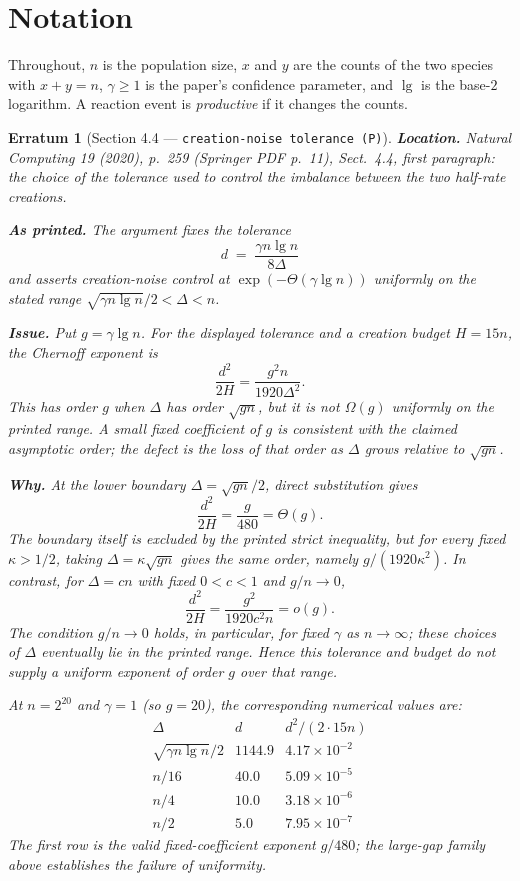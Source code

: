 \documentclass[11pt]{article}
\theoremstyle{erratumstyle}
\newtheorem{erratum}{Erratum}
\newcommand{\lgn}{\lg n}
\begin{document}
\section*{Notation}

Throughout, $n$ is the population size, $x$ and $y$ are the counts of the two
species with $x+y=n$, $\gamma \ge 1$ is the paper's confidence parameter, and
$\lg$ is the base-$2$ logarithm. A reaction event is \emph{productive} if it
changes the counts.

\begin{erratum}[Section 4.4 --- \texttt{creation-noise tolerance (P)}]
\textbf{Location.} \emph{Natural Computing} 19 (2020), p.~259
(Springer PDF p.~11), Sect.~4.4, first paragraph: the choice of the tolerance
used to control the imbalance between the two half-rate creations.

\medskip
\textbf{As printed.} The argument fixes the tolerance
\[
  d \;=\; \frac{\gamma n\lgn}{8\Delta}
\]
and asserts creation-noise control at $\exp(-\Theta(\gamma\lgn))$ uniformly on
the stated range $\sqrt{\gamma n\lgn}/2 < \Delta < n$.

\medskip
\textbf{Issue.} Put $g=\gamma\lgn$. For the displayed tolerance and a
creation budget $H=15n$, the Chernoff exponent is
\[
  \frac{d^2}{2H}=\frac{g^2n}{1920\Delta^2}.
\]
This has order $g$ when $\Delta$ has order $\sqrt{gn}$, but it is not
$\Omega(g)$ uniformly on the printed range. A small fixed coefficient of
$g$ is consistent with the claimed asymptotic order; the defect is the loss
of that order as $\Delta$ grows relative to $\sqrt{gn}$.

\medskip
\textbf{Why.} At the lower boundary $\Delta=\sqrt{gn}/2$, direct substitution
gives
\[
  \frac{d^2}{2H}=\frac{g}{480}=\Theta(g).
\]
The boundary itself is excluded by the printed strict inequality, but for
every fixed $\kappa>1/2$, taking $\Delta=\kappa\sqrt{gn}$ gives the same
order, namely $g/(1920\kappa^2)$. In contrast, for $\Delta=cn$ with fixed
$0<c<1$ and $g/n\to0$,
\[
  \frac{d^2}{2H}=\frac{g^2}{1920c^2n}=o(g).
\]
The condition $g/n\to0$ holds, in particular, for fixed $\gamma$ as
$n\to\infty$; these choices of $\Delta$ eventually lie in the printed
range. Hence this tolerance and budget do not supply a uniform exponent
of order $g$ over that range.

At $n=2^{20}$ and $\gamma=1$ (so $g=20$), the corresponding numerical
values are:
\[
  \begin{array}{c|c|c}
    \Delta & d & d^2/(2\cdot 15 n)\\\hline
    \sqrt{\gamma n\lgn}/2 & 1144.9 & 4.17\times10^{-2}\\
    n/16 & 40.0 & 5.09\times10^{-5}\\
    n/4 & 10.0 & 3.18\times10^{-6}\\
    n/2 & 5.0 & 7.95\times10^{-7}
  \end{array}
\]
The first row is the valid fixed-coefficient exponent $g/480$; the
large-gap family above establishes the failure of uniformity.


\end{erratum}
\end{document}
